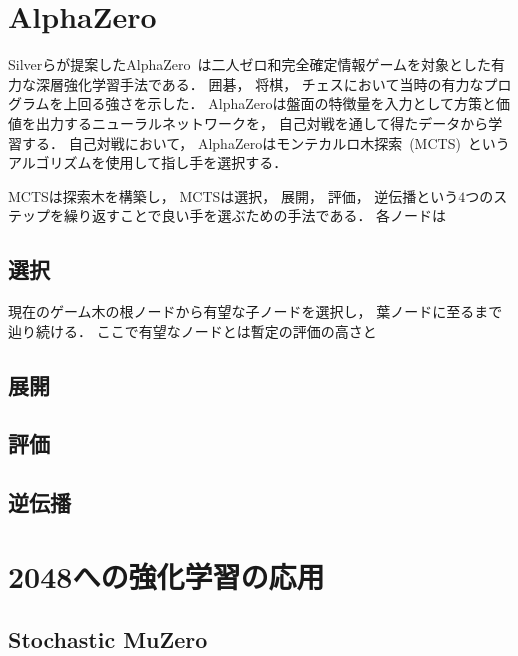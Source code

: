 \section{AlphaZero}
Silverらが提案したAlphaZero~\cite{AlphaZero}は二人ゼロ和完全確定情報ゲームを対象とした有力な深層強化学習手法である．
囲碁， 将棋， チェスにおいて当時の有力なプログラムを上回る強さを示した．
AlphaZeroは盤面の特徴量を入力として方策と価値を出力するニューラルネットワークを， 自己対戦を通して得たデータから学習する．
自己対戦において， AlphaZeroはモンテカルロ木探索~(MCTS)~というアルゴリズムを使用して指し手を選択する．

MCTSは探索木を構築し， 
MCTSは選択， 展開， 評価， 逆伝播という$4$つのステップを繰り返すことで良い手を選ぶための手法である．
各ノードは

\subsection*{選択}
現在のゲーム木の根ノードから有望な子ノードを選択し， 葉ノードに至るまで辿り続ける．
ここで有望なノードとは暫定の評価の高さと
\subsection*{展開}
\subsection*{評価}
\subsection*{逆伝播}

\section{2048への強化学習の応用}
\subsection{Stochastic MuZero}
